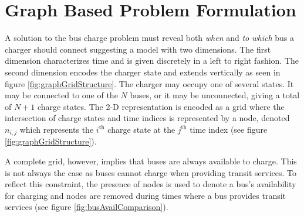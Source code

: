 \section{Graph Based Problem Formulation}
A solution to the bus charge problem must reveal both \textit{when} and \textit{to which} bus a charger should connect suggesting a model with two dimensions. The first dimension characterizes time and is given discretely in a left to right fashion. The second dimension encodes the charger state and extends vertically as seen in figure \ref{fig:graphGridStructure}.  The charger may occupy one of several states.  It may be connected to one of the $N$ buses, or it may be unconnected, giving a total of $N + 1$ charge states. The 2-D representation is encoded as a grid where the intersection of charge states and time indices is represented by a node, denoted $n_{i,j}$ which represents the $i^{\text{th}}$ charge state at the $j^{\text{th}}$ time index (see figure \ref{fig:graphGridStructure}).  
\par A complete grid, however, implies that buses are always available to charge.  This is not always the case as buses cannot charge when providing transit services. To reflect this constraint, the presence of nodes is used to denote a bus's availability for charging and nodes are removed during times where a bus provides transit services (see figure \ref{fig:busAvailComparison}). 
